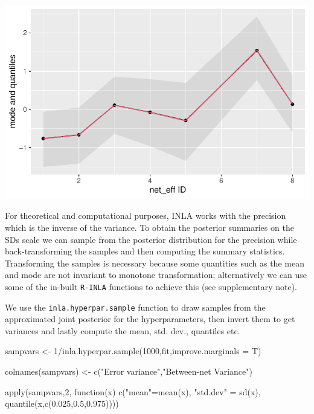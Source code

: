 \documentclass[
  letterpaper,
  DIV=11,
  numbers=noendperiod]{scrartcl}
\newenvironment{Shaded}{\begin{snugshade}}{\end{snugshade}}
\newcommand{\AttributeTok}[1]{\textcolor[rgb]{0.40,0.45,0.13}{#1}}
\newcommand{\ControlFlowTok}[1]{\textcolor[rgb]{0.00,0.23,0.31}{#1}}
\newcommand{\DecValTok}[1]{\textcolor[rgb]{0.68,0.00,0.00}{#1}}
\newcommand{\FloatTok}[1]{\textcolor[rgb]{0.68,0.00,0.00}{#1}}
\newcommand{\FunctionTok}[1]{\textcolor[rgb]{0.28,0.35,0.67}{#1}}
\newcommand{\NormalTok}[1]{\textcolor[rgb]{0.00,0.23,0.31}{#1}}
\newcommand{\OtherTok}[1]{\textcolor[rgb]{0.00,0.23,0.31}{#1}}
\newcommand{\SpecialCharTok}[1]{\textcolor[rgb]{0.37,0.37,0.37}{#1}}
\newcommand{\StringTok}[1]{\textcolor[rgb]{0.13,0.47,0.30}{#1}}
\begin{document}
\includegraphics{day1_practical_2_files/figure-pdf/unnamed-chunk-20-1.pdf}

For theoretical and computational purposes, INLA works with the
precision which is the inverse of the variance. To obtain the posterior
summaries on the SDs scale we can sample from the posterior distribution
for the precision while back-transforming the samples and then computing
the summary statistics. Transforming the samples is necessary because
some quantities such as the mean and mode are not invariant to monotone
transformation; alternatively we can use some of the in-built
\texttt{R-INLA} functions to achieve this (see supplementary note).

We use the \texttt{inla.hyperpar.sample} function to draw samples from
the approximated joint posterior for the hyperparameters, then invert
them to get variances and lastly compute the mean, std. dev., quantiles
etc.

\begin{Shaded}
\begin{Highlighting}[]
\NormalTok{sampvars }\OtherTok{\textless{}{-}} \DecValTok{1}\SpecialCharTok{/}\FunctionTok{inla.hyperpar.sample}\NormalTok{(}\DecValTok{1000}\NormalTok{,fit,}\AttributeTok{improve.marginals =}\NormalTok{ T)}

\FunctionTok{colnames}\NormalTok{(sampvars) }\OtherTok{\textless{}{-}} \FunctionTok{c}\NormalTok{(}\StringTok{"Error variance"}\NormalTok{,}\StringTok{"Between{-}net Variance"}\NormalTok{)}

\FunctionTok{apply}\NormalTok{(sampvars,}\DecValTok{2}\NormalTok{,}
      \ControlFlowTok{function}\NormalTok{(x) }\FunctionTok{c}\NormalTok{(}\StringTok{"mean"}\OtherTok{=}\FunctionTok{mean}\NormalTok{(x),}
                    \StringTok{"std.dev"} \OtherTok{=} \FunctionTok{sd}\NormalTok{(x),}
                    \FunctionTok{quantile}\NormalTok{(x,}\FunctionTok{c}\NormalTok{(}\FloatTok{0.025}\NormalTok{,}\FloatTok{0.5}\NormalTok{,}\FloatTok{0.975}\NormalTok{))))}
\end{Highlighting}
\end{Shaded}
\end{document}
